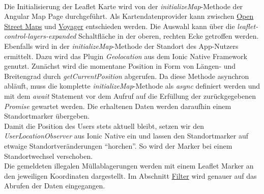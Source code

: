 \documentclass[a4paper, 11pt, DIV=11, listof=numbered, numbers=noenddot]{scrartcl}
\begin{document}
	\textbf{}\\
	Die Initialisierung der Leaflet Karte wird von der \textit{initializeMap}-Methode der Angular Map Page durchgeführt. Als Kartendatenprovider kann zwischen \href{https://www.openstreetmap.org}{Open Street Maps} und \href{http://voyager.basemaps.cartocdn.com}	{Voyager} entschieden werden. Die Auswahl kann über die \textit{leaflet-control-layers-expanded} Schaltfläche in der oberen, rechten Ecke getroffen werden.\\
	Ebenfalls wird in der \textit{initializeMap}-Methode der Standort des App-Nutzers ermittelt. Dazu wird das Plugin \textit{Geolocation} aus dem Ionic Native Framework genutzt. Zunächst wird die momentane Position in Form von Längen- und Breitengrad durch \textit{getCurrentPosition} abgerufen. Da diese Methode asynchron abläuft, muss die komplette \textit{initializeMap}-Methode als \textit{async} definiert werden und mit dem \textit{await} Statement vor dem Aufruf auf die Erfüllung der zurückgegebenen \textit{Promise} gewartet werden. Die erhaltenen Daten werden daraufhin einem Standortmarker übergeben.\\
	Damit die Position des Users stets aktuell bleibt, setzen wir den \textit{UserLocationObserver} aus Ionic Native ein und lassen den Standortmarker auf etwaige Standortveränderungen \enquote{horchen}. So wird der Marker bei einem Standortwechsel verschoben.\\
	Die gemeldeten illegalen Müllablagerungen werden mit einem Leaflet Marker an den jeweiligen Koordinaten dargestellt. Im Abschnitt \hyperref[par:filter]{Filter} wird genauer auf das Abrufen der Daten eingegangen.

	\newpage
\end{document}
